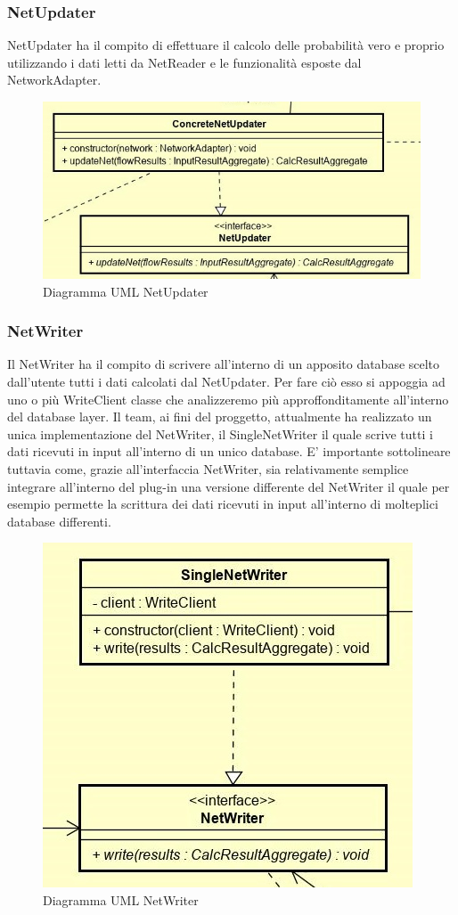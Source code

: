 \subsubsection{NetUpdater}
NetUpdater ha il compito di effettuare il calcolo delle probabilità vero e proprio utilizzando i dati letti da NetReader e le funzionalità esposte dal NetworkAdapter.
\begin{figure} [H]
	\centering
	\includegraphics[scale=0.8]{Img/NetUpdater}
	\caption{Diagramma UML NetUpdater}\label{}
\end{figure}
\subsubsection{NetWriter}
Il NetWriter ha il compito di scrivere all'interno di un apposito database scelto dall'utente tutti i dati calcolati dal NetUpdater. Per fare ciò esso si appoggia ad uno o più WriteClient classe che analizzeremo più approffonditamente all'interno del database layer.
Il team, ai fini del proggetto, attualmente ha realizzato un unica implementazione del NetWriter, il SingleNetWriter il quale scrive tutti i dati ricevuti in input all'interno di un unico database. 
E' importante sottolineare tuttavia come, grazie all'interfaccia NetWriter, sia relativamente semplice integrare all'interno del plug-in una versione differente del NetWriter il quale per esempio permette la scrittura dei dati ricevuti in input all'interno di molteplici database differenti.
\begin{figure} [H]
	\centering
	\includegraphics[scale=1]{Img/NetWriter}
	\caption{Diagramma UML NetWriter}\label{}
\end{figure}
